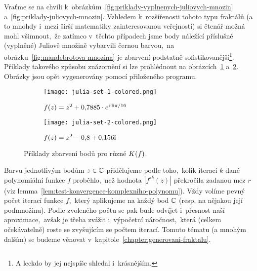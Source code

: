 Vraťme se na chvíli k~obrázkům~\ref{fig:priklady-vyplnenych-juliovych-mnozin} a~\ref{fig:priklady-juliovych-mnozin}. Vzhledem k~rozšířenosti tohoto typu fraktálů (a to mnohdy i~mezi širší matematiky zainteresovanou veřejností) si čtenář možná mohl všimnout,~že zatímco v~těchto případech jsme body náležící příslušné (vyplněné) Juliově množině vybarvili černou barvou,~na obrázku~\ref{fig:mandebrotova-mnozina} je zbarvení podstatně sofistikovanější\footnote{A leckdo by jej nejspíše shledal i~krásnějším.}. Příklady takového způsobu znázornění si lze prohlédnout na obrázcích~\ref{subfig:vyplnena-juliova-mnozina-1-obarveno} a~\ref{subfig:vyplnena-juliova-mnozina-2-obarveno}. Obrázky jsou opět vygenerovány pomocí přiloženého programu.
\begin{figure}[h]
    \centering
    \begin{subfigure}{0.48\textwidth}
        \centering
        \texttt{[image: julia-set-1-colored.png]}
        \caption{$f(z)=z^2 + 0{,}7885\cdot e^{\textrm{i}\cdot9\pi/16}$}
        \label{subfig:vyplnena-juliova-mnozina-1-obarveno}
    \end{subfigure}
    \quad
    \begin{subfigure}{0.48\textwidth}
        \centering
        \texttt{[image: julia-set-2-colored.png]}
        \caption{$f(z)=z^2 - 0{,}8 + 0{,}156\textrm{i}$}
        \label{subfig:vyplnena-juliova-mnozina-2-obarveno}
    \end{subfigure}
    \caption{Příklady zbarvení bodů pro různé $K(f)$.}
    \label{fig:priklady-vyplnenych-juliovych-mnozin-obarveno}
\end{figure}

Barvu jednotlivým bodům $z\in\mathbb{C}$ přidělujeme podle toho,~kolik iterací $k$ dané polynomiální funkce $f$ proběhlo,~než hodnota $|f^{\circ k}(z)|$ překročila zadanou mez $r$ (viz lemma~\ref{lem:test-konvergence-komplexniho-polynomu}). Vždy volíme pevný počet iterací funkce $f$,~který aplikujeme na každý bod $\mathbb{C}$ (resp. na nějakou její podmnožinu). Podle zvoleného počtu se pak bude odvíjet i~přesnost naší aproximace,~avšak je třeba zvážit i~výpočetní náročnost,~která (celkem očekávatelně) roste se zvyšujícím se počtem iterací. Tomuto tématu (a mnohým dalším) se budeme věnovat v~kapitole~\ref{chapter:generovani-fraktalu}.
 

